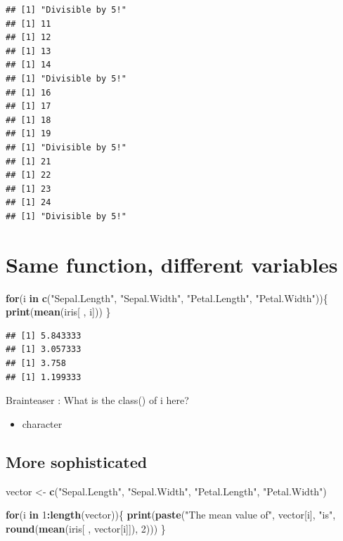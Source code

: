 \documentclass[
]{book}
\newenvironment{Shaded}{\begin{snugshade}}{\end{snugshade}}
\newcommand{\ControlFlowTok}[1]{\textcolor[rgb]{0.13,0.29,0.53}{\textbf{#1}}}
\newcommand{\DecValTok}[1]{\textcolor[rgb]{0.00,0.00,0.81}{#1}}
\newcommand{\FunctionTok}[1]{\textcolor[rgb]{0.13,0.29,0.53}{\textbf{#1}}}
\newcommand{\NormalTok}[1]{#1}
\newcommand{\OtherTok}[1]{\textcolor[rgb]{0.56,0.35,0.01}{#1}}
\newcommand{\SpecialCharTok}[1]{\textcolor[rgb]{0.81,0.36,0.00}{\textbf{#1}}}
\newcommand{\StringTok}[1]{\textcolor[rgb]{0.31,0.60,0.02}{#1}}
\providecommand{\tightlist}{%
  \setlength{\itemsep}{0pt}\setlength{\parskip}{0pt}}
\begin{document}
\begin{verbatim}
## [1] "Divisible by 5!"
## [1] 11
## [1] 12
## [1] 13
## [1] 14
## [1] "Divisible by 5!"
## [1] 16
## [1] 17
## [1] 18
## [1] 19
## [1] "Divisible by 5!"
## [1] 21
## [1] 22
## [1] 23
## [1] 24
## [1] "Divisible by 5!"
\end{verbatim}

\section{Same function, different variables}\label{same-function-different-variables}

\begin{Shaded}
\begin{Highlighting}[]
\ControlFlowTok{for}\NormalTok{(i }\ControlFlowTok{in} \FunctionTok{c}\NormalTok{(}\StringTok{"Sepal.Length"}\NormalTok{, }\StringTok{"Sepal.Width"}\NormalTok{, }\StringTok{"Petal.Length"}\NormalTok{, }\StringTok{"Petal.Width"}\NormalTok{))\{}
  \FunctionTok{print}\NormalTok{(}\FunctionTok{mean}\NormalTok{(iris[ , i]))}
\NormalTok{\}}
\end{Highlighting}
\end{Shaded}

\begin{verbatim}
## [1] 5.843333
## [1] 3.057333
## [1] 3.758
## [1] 1.199333
\end{verbatim}

Brainteaser : What is the class() of i here?

\begin{itemize}
\tightlist
\item
  character
\end{itemize}

\subsection{More sophisticated}\label{more-sophisticated}

\begin{Shaded}
\begin{Highlighting}[]
\NormalTok{vector }\OtherTok{\textless{}{-}} \FunctionTok{c}\NormalTok{(}\StringTok{"Sepal.Length"}\NormalTok{, }\StringTok{"Sepal.Width"}\NormalTok{, }\StringTok{"Petal.Length"}\NormalTok{, }\StringTok{"Petal.Width"}\NormalTok{)}

\ControlFlowTok{for}\NormalTok{(i }\ControlFlowTok{in} \DecValTok{1}\SpecialCharTok{:}\FunctionTok{length}\NormalTok{(vector))\{}
  \FunctionTok{print}\NormalTok{(}\FunctionTok{paste}\NormalTok{(}\StringTok{"The mean value of"}\NormalTok{, vector[i], }\StringTok{"is"}\NormalTok{, }
              \FunctionTok{round}\NormalTok{(}\FunctionTok{mean}\NormalTok{(iris[ , vector[i]]), }\DecValTok{2}\NormalTok{)))}
\NormalTok{\}}
\end{Highlighting}
\end{Shaded}
\end{document}
